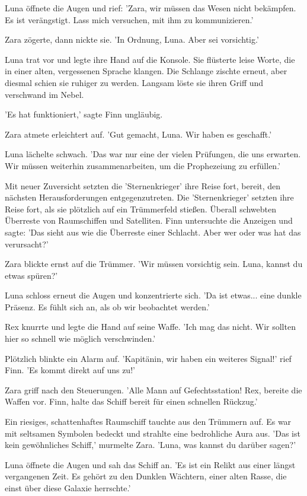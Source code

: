\documentclass[12pt]{article}
\begin{document}
Luna öffnete die Augen und rief: 'Zara, wir müssen das Wesen nicht bekämpfen. Es ist verängstigt. Lass mich versuchen, mit ihm zu kommunizieren.'

Zara zögerte, dann nickte sie. 'In Ordnung, Luna. Aber sei vorsichtig.'

Luna trat vor und legte ihre Hand auf die Konsole. Sie flüsterte leise Worte, die in einer alten, vergessenen Sprache klangen. Die Schlange zischte erneut, aber diesmal schien sie ruhiger zu werden. Langsam löste sie ihren Griff und verschwand im Nebel.

'Es hat funktioniert,' sagte Finn ungläubig.

Zara atmete erleichtert auf. 'Gut gemacht, Luna. Wir haben es geschafft.'

Luna lächelte schwach. 'Das war nur eine der vielen Prüfungen, die uns erwarten. Wir müssen weiterhin zusammenarbeiten, um die Prophezeiung zu erfüllen.'

Mit neuer Zuversicht setzten die 'Sternenkrieger' ihre Reise fort, bereit, den nächsten Herausforderungen entgegenzutreten. Die 'Sternenkrieger' setzten ihre Reise fort, als sie plötzlich auf ein Trümmerfeld stießen. Überall schwebten Überreste von Raumschiffen und Satelliten. Finn untersuchte die Anzeigen und sagte: 'Das sieht aus wie die Überreste einer Schlacht. Aber wer oder was hat das verursacht?'

Zara blickte ernst auf die Trümmer. 'Wir müssen vorsichtig sein. Luna, kannst du etwas spüren?'

Luna schloss erneut die Augen und konzentrierte sich. 'Da ist etwas... eine dunkle Präsenz. Es fühlt sich an, als ob wir beobachtet werden.'

Rex knurrte und legte die Hand auf seine Waffe. 'Ich mag das nicht. Wir sollten hier so schnell wie möglich verschwinden.'

Plötzlich blinkte ein Alarm auf. 'Kapitänin, wir haben ein weiteres Signal!' rief Finn. 'Es kommt direkt auf uns zu!'

Zara griff nach den Steuerungen. 'Alle Mann auf Gefechtsstation! Rex, bereite die Waffen vor. Finn, halte das Schiff bereit für einen schnellen Rückzug.'

Ein riesiges, schattenhaftes Raumschiff tauchte aus den Trümmern auf. Es war mit seltsamen Symbolen bedeckt und strahlte eine bedrohliche Aura aus. 'Das ist kein gewöhnliches Schiff,' murmelte Zara. 'Luna, was kannst du darüber sagen?'

Luna öffnete die Augen und sah das Schiff an. 'Es ist ein Relikt aus einer längst vergangenen Zeit. Es gehört zu den Dunklen Wächtern, einer alten Rasse, die einst über diese Galaxie herrschte.'
\end{document}
